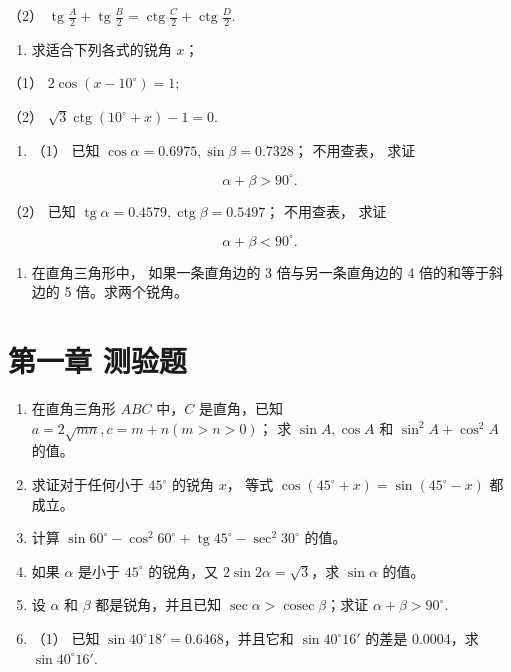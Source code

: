 （2）
\(\operatorname{tg} \frac{A}{2} + \operatorname{tg} \frac{B}{2} = \operatorname{ctg} \frac{C}{2} + \operatorname{ctg} \frac{D}{2}\).

\begin{enumerate}[start=4]
\item
  求适合下列各式的锐角 \(x\)；
\end{enumerate}

（1） \(2\cos (x - 10^{\circ}) = 1;\)

（2） \(\sqrt{3} \operatorname{ctg}(10^{\circ} + x) - 1 = 0.\)

\begin{enumerate}[start=5]
\item
  （1） 已知 \(\cos \alpha = 0.6975, \sin \beta = 0.7328\)； 不用查表，
  求证
\end{enumerate}

\[
\alpha + \beta > 90 ^{\circ}.
\]

（2） 已知
\(\operatorname{tg} \alpha = 0.4579, \operatorname{ctg} \beta = 0.5497\)；
不用查表， 求证

\[
\alpha + \beta <   90 ^{\circ}.
\]

\begin{enumerate}[start=6]
\item
  在直角三角形中， 如果一条直角边的 3 倍与另一条直角边的 4
  倍的和等于斜边的 5 倍。求两个锐角。
\end{enumerate}

\section{第一章 测验题}

\begin{enumerate}
\item
  在直角三角形 \(ABC\) 中，\(C\) 是直角，已知
  \(a = 2\sqrt{mn}, c = m + n (m > n > 0)\)； 求 \(\sin A, \cos A\) 和
  \(\sin^2 A + \cos^2 A\) 的值。
\item
  求证对于任何小于 \(45^{\circ}\) 的锐角 \(x\)， 等式
  \(\cos (45^{\circ} + x) = \sin (45^{\circ} - x)\) 都成立。
\item
  计算
  \(\sin 60^{\circ} - \cos^{2}60^{\circ} + \operatorname{tg}45^{\circ} - \sec^{2}30^{\circ}\)
  的值。
\item
  如果 \(\alpha\) 是小于 \(45^{\circ}\) 的锐角，又
  \(2\sin 2\alpha = \sqrt{3}\)，求 \(\sin \alpha\) 的值。
\item
  设 \(\alpha\) 和 \(\beta\) 都是锐角，并且已知
  \(\sec \alpha > \operatorname{cosec} \beta\)；求证
  \(\alpha + \beta > 90^\circ\).
\item
  （1） 已知 \(\sin 40^{\circ}18' = 0.6468\)，并且它和
  \(\sin 40^{\circ}16'\) 的差是 0.0004，求 \(\sin 40^{\circ}16'\).
\end{enumerate}

